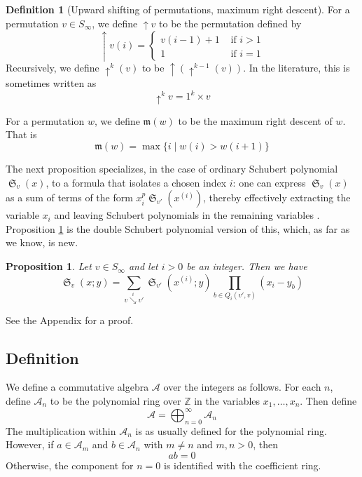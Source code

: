 \documentclass{amsart}
\newtheorem{proposition}[lemma]{Proposition}
\theoremstyle{definition}
\newtheorem{definition}[lemma]{Definition}
\theoremstyle{remark}
\numberwithin{equation}{subsection}
\DeclareMathOperator{\sch}{\mathfrak{S}}
\newcommand{\shup}{{\uparrow}}
\newcommand{\downvar}[1]{\stackrel{#1}{\searrow}}
\newcommand{\smpre}[2]{\ensuremath{}\prod_{b\in #2}(#1-b)}
\newcommand{\coma}{\mathcal{A}}
\newcommand{\maxd}{\mathfrak{m}}
\begin{document}
\begin{definition}[Upward shifting of permutations, maximum right descent]
		For a permutation $v\in S_\infty$, we define $\shup{v}$ to be the permutation defined by
		$$\shup{v}(i) = \begin{cases}
			v(i-1)+1&\mbox{ if }i>1\\
			1&\mbox{ if }i=1
		\end{cases}$$
		Recursively, we define $\shup^k(v)$ to be $\shup(\shup^{k-1}(v))$. In the literature, this is sometimes written as
    $$\shup^kv = 1^k\times v$$

		For a permutation $w$, we define $\maxd(w)$ to be the maximum right descent of $w$. That is
		$$\maxd(w) = \max\{i\mid w(i)>w(i+1)\}$$

	\end{definition}

	

The next proposition specializes, in the case of ordinary Schubert polynomial $\sch_v(x)$, to a formula that isolates a chosen index $i$: one can express $\sch_v(x)$ as a sum of terms of the form $x_i^p\sch_{v'}(x^{(i)})$, thereby effectively extracting the variable $x_i$ and leaving Schubert polynomials in the remaining variables \cite[Theorem~5.1]{bsskew}. Proposition \ref{proposition:pullindex} is the double Schubert polynomial version of this, which, as far as we know, is new.%

\begin{proposition} \label{proposition:pullindex}
Let $v\in S_\infty$ and let $i>0$ be an integer. Then we have
$$\sch_v(x;y)=\sum_{v\downvar{i} v'}\sch_{v'}(x^{(i)};y)\prod_{b\in Q_i(v',v)}(x_i - y_b)$$
\end{proposition}
See the Appendix for a proof.

\subsection{Definition}


We define a commutative algebra $\coma$ over the integers as follows. For each $n$, define $\coma_n$ to be the polynomial ring over $\mathbb{Z}$ in the variables $x_1,\ldots,x_n$. Then define
$$\coma =\bigoplus_{n=0}^\infty \coma_n$$
The multiplication within $\coma_n$ is as usually defined for the polynomial ring. However, if $a\in \coma_m$ and $b\in \coma_n$ with $m\neq n$ and $m,n>0$,  then
$$ab = 0$$
Otherwise, the component for $n=0$ is identified with the coefficient ring.
\end{document}
